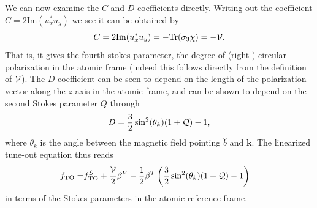 	We can now examine the $C$ and $D$ coefficients directly.
	Writing out the coefficient $C=2\mathrm{Im}(u_{x}^*u_y)$ we see it can be obtained by 
	\begin{equation}
	C=2\mathrm{Im}(u_{x}^*u_y) = -\mathrm{Tr}(\sigma_3\chi) = -\mathcal{V}.
	\end{equation}
	That is, it gives the fourth stokes parameter, the degree of (right-) circular polarization in the atomic frame (indeed this follows directly from the definition of $\mathcal{V}$).
	The $D$ coefficient can be seen to depend on the length of the polarization vector along the $z$ axis in the atomic frame, and can be shown \cite{Henson22} to depend on the second Stokes parameter $Q$ through
	\begin{equation}
		D = \frac{3}{2}\sin^2(\theta_k)(1+\mathcal{Q}) - 1,
	\end{equation}
	where $\theta_k$ is the angle between the magnetic field pointing $\hat{b}$ and $\mathbf{k}$.
	The linearized tune-out equation thus reads
	\begin{align}
		 f_\mathrm{TO} = & f_\mathrm{TO}^S + \frac{\mathcal{V}}{2}\beta^V - \frac{1}{2}\beta^T \left(\frac{3}{2}\sin^2(\theta_k)(1+\mathcal{Q}) - 1\right)
	\end{align}
	in terms of the Stokes parameters in the atomic reference frame. 




